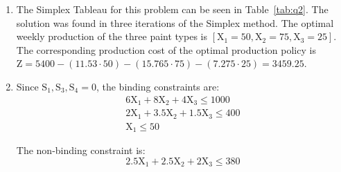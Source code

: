 \begin{enumerate}

\item 
The Simplex Tableau for this problem can be seen in Table~\ref{tab:q2}. The solution was found in three iterations of the Simplex method. The optimal weekly production of the three paint types is $[\text{X}_1 = 50, \text{X}_2 = 75, \text{X}_3 = 25]$. The corresponding production cost of the optimal production policy is $\text{Z} = 5400 - (11.53 \cdot 50) - (15.765 \cdot 75) - (7.275 \cdot 25) = 3459.25$.

\item
Since $\text{S}_1, \text{S}_3, \text{S}_4 = 0$, the binding constraints are:
\begin{gather*}
	6\text{X}_1 + 8\text{X}_2 + 4\text{X}_3 \leq 1000 \\
	2\text{X}_1 + 3.5\text{X}_2 + 1.5\text{X}_3 \leq 400 \\
	\text{X}_1 \leq 50
\end{gather*}

The non-binding constraint is:
\begin{equation*}
	2.5\text{X}_1 + 2.5\text{X}_2 + 2\text{X}_3 \leq 380
\end{equation*}
	
\end{enumerate}


